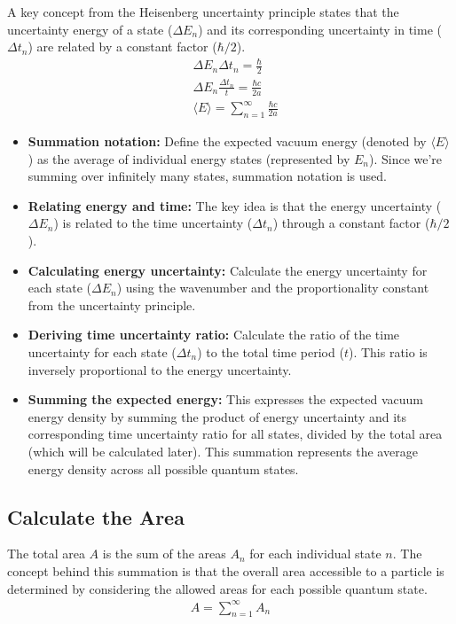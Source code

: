 A key concept from the Heisenberg uncertainty principle states that 
the uncertainty energy of a state ($\Delta E_n$) and its corresponding uncertainty in time ($\Delta t_n$) are 
related by a constant factor ($\hbar/2$).
\begin{align}
    &\Delta E_n \Delta t_n = \frac{\hbar}{2}\\
    &\Delta E_n \frac{\Delta t_n}{t} = \frac{\hbar c }{2 a}\\
    &\langle E \rangle = \sum_{n=1}^{\infty} \frac{\hbar c }{2 a}
\end{align}
\begin{itemize}
    \item \textbf{Summation notation:} Define the expected vacuum energy (denoted by $\langle E \rangle$ ) 
    as the average of individual energy states (represented by $E_n$). 
    Since we're summing over infinitely many states, summation notation is used.
    \item \textbf{Relating energy and time:} The key idea is that the energy uncertainty ($\Delta E_n$) is related 
    to the time uncertainty ($\Delta t_n$) through a constant factor ($\hbar/2$).
    \item \textbf{Calculating energy uncertainty:} Calculate the energy uncertainty for each state ($\Delta E_n$)
     using the wavenumber and the proportionality constant from the uncertainty principle.
    \item \textbf{Deriving time uncertainty ratio:} Calculate the ratio of the time uncertainty for each state ($\Delta t_n$)
     to the total time period ($t$). This ratio is inversely proportional to the energy uncertainty.
    \item \textbf{Summing the expected energy:} This expresses the expected vacuum energy density by summing 
    the product of energy uncertainty and its corresponding time uncertainty ratio for all states, 
    divided by the total area (which will be calculated later). 
    This summation represents the average energy density across all possible quantum states.
\end{itemize}

\subsection*{Calculate the Area}

The total area $A$ is the sum of the areas $A_n$ for each individual state $n$.
The concept behind this summation is that the overall area accessible to 
a particle is determined by considering the allowed areas for each possible quantum state.
\begin{align}
    A = \sum_{n=1}^{\infty}A_n
\end{align}

